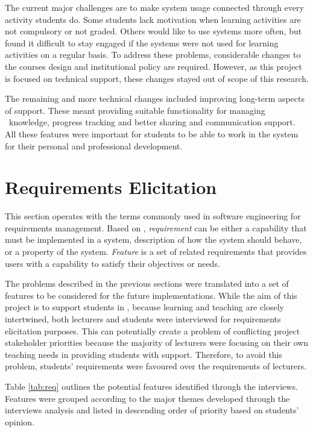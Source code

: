 The current major challenges are to make system usage connected through every
activity students do. Some students lack motivation when learning activities are
not compulsory or not graded. Others would like to use systems more often, but
found it difficult to stay engaged if the systems were not used for learning
activities on a regular basis. To address these problems, considerable changes
to the courses design and institutional policy are required. However, as this
project is focused on technical support, these changes stayed out of scope of
this research.

The remaining and more technical changes included improving long-term aspects of
\LLLs support. These meant providing suitable functionality for managing
\ep~knowledge, progress tracking and better sharing and communication support.
All these features were important for students to be able to work in the system
for their personal and professional development. 

\section{Requirements Elicitation}
\label{sec:elicit}
This section operates with the terms commonly used in software engineering for
requirements management. Based on \citet{Wiegers2003}, \textit{requirement} can
be either a capability that must be implemented in a system, description of how
the system should behave, or a property of the system. \textit{Feature} is a set
of related requirements that provides users with a capability to satisfy their
objectives or needs.

The problems described in the previous sections were translated into a set of
features to be considered for the future implementations. While the aim of this
project is to support students in \LLLsn, because learning and teaching are
closely intertwined, both lecturers and students were interviewed for
requirements elicitation purposes. This can potentially create a problem of
conflicting project stakeholder priorities \citep{Leffingwell2011} because the
majority of lecturers were focusing on their own teaching needs in providing
students with \LLLs support. Therefore, to avoid this problem, students'
requirements were favoured over the requirements of lecturers. 

Table \ref{tab:req} outlines the potential features identified through the
interviews. Features were grouped according to the major themes developed
through the interviews analysis and listed in descending order of priority based
on students' opinion.

